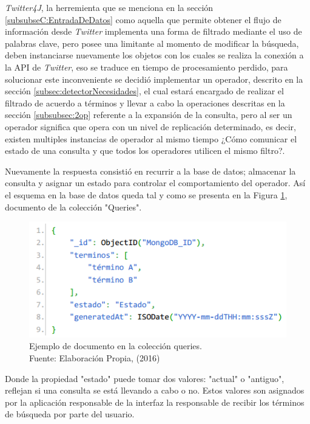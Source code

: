 \textit{Twitter4J}, la herremienta que se menciona en la sección \ref{subsubseC:EntradaDeDatos} como aquella que permite obtener el flujo de información desde \textit{Twitter} implementa una forma de filtrado mediante el uso de palabras clave, pero posee una limitante al momento de modificar la búsqueda, deben instanciarse nuevamente los objetos con los cuales se realiza la conexión a la API de \textit{Twitter}, eso se traduce en tiempo de procesamiento perdido, para solucionar este inconveniente se decidió implementar un operador, descrito en la sección \ref{subsec:detectorNecesidades}, el cual estará encargado de realizar el filtrado de acuerdo a términos y llevar a cabo la operaciones descritas en la sección \ref{subsubsec:2op} referente a la expansión de la consulta, pero al ser un operador significa que opera con un nivel de replicación determinado, es decir, existen multiples instancias de operador al mismo tiempo ¿Cómo comunicar el estado de una consulta y que todos los operadores utilicen el mismo filtro?.

Nuevamente la respuesta consistió en recurrir a la base de datos; almacenar la consulta y asignar un estado para controlar el comportamiento del operador. Así el esquema en la base de datos queda tal y como se presenta en la Figura \ref{fig:esquemaQuery}, documento de la colección "Queries".

\begin{figure}[H]
	\centering
	\captionsetup{justification=centering}
	\includegraphics[scale=0.8]{images/Query.png}
	\caption[Ejemplo de documento en la colección queries.]{Ejemplo de documento en la colección queries.\\Fuente: Elaboración Propia, (2016)}
	\label{fig:esquemaQuery}
\end{figure}

Donde la propiedad "estado" puede tomar dos valores: "actual" o "antiguo", reflejan si una consulta se está llevando a cabo o no. Estos valores son asignados por la aplicación responsable de la interfaz la responsable de recibir los términos de búsqueda por parte del usuario.

